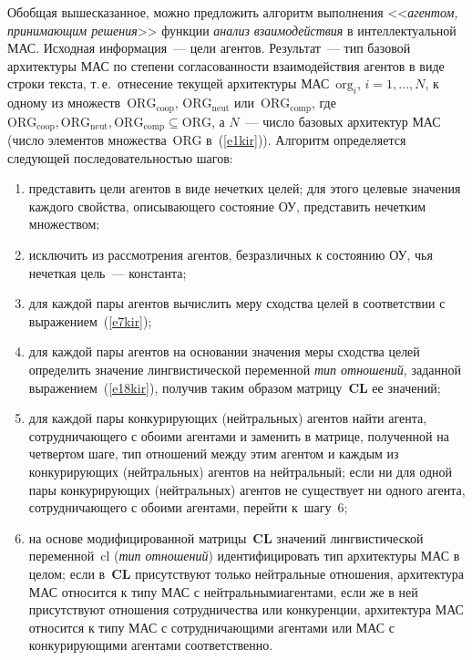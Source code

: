 \begin{multicols}{2}
  Обобщая вышесказанное, можно предложить алгоритм выполнения 
<<\textit{агентом, принимающим решения}>> функции \textit{анализ 
взаимодействия} в интеллектуальной МАС. Исходная информация~--- цели 
агентов. Результат~--- тип базовой архитектуры МАС по степени 
согласованности взаимодействия агентов в виде строки текста, т.\,е.\ отнесение 
текущей архитектуры МАС~$\mathrm{org}_i$, $i = 1, \ldots , N$, к одному из 
множеств~$\mathrm{ORG}_{\mathrm{coop}}$, $\mathrm{ORG}_{\mathrm{neut}}$ или~$\mathrm{ORG}_{\mathrm{comp}}$, где 
$\mathrm{ORG}_{\mathrm{coop}}, \mathrm{ORG}_{\mathrm{neut}}, \mathrm{ORG}_{\mathrm{comp}} 
\subseteq \mathrm{ORG}$, а  $N$~--- число 
базовых архитектур МАС (число элементов множества~ORG в~(\ref{e1kir})). 
Алгоритм определяется следующей последовательностью шагов:
  \begin{enumerate}[(1)]
\item представить цели агентов в виде нечетких целей; для этого целевые 
значения каждого свойства, описывающего состояние ОУ, представить 
нечетким множеством;
\item исключить из рассмотрения агентов, безразличных к состоянию ОУ, чья 
нечеткая цель~--- константа;
\item для каждой пары агентов вычислить меру сходства целей в соответствии с 
выражением~(\ref{e7kir});
\item для каждой пары агентов на основании значения меры сходства целей 
определить значение лингвистической переменной \textit{тип отношений}, 
заданной выражением~(\ref{e18kir}), получив таким образом 
матрицу~\textbf{CL} ее значений;
\item для каждой пары конкурирующих (нейтральных) агентов найти агента, 
сотрудничающего с обоими агентами и заменить в матрице, полученной на 
четвертом шаге, тип отношений между этим агентом и каждым из 
конкурирующих (нейт\-раль\-ных) агентов на нейтральный; если ни для одной 
пары конкурирующих (нейт\-раль\-ных) агентов не существует ни одного агента, 
сотрудничающего с обоими агентами, перейти к~шагу~6;
\item на основе модифицированной матрицы~\textbf{CL} значений 
лингвистической переменной~cl (\textit{тип отношений}) идентифицировать 
тип архитектуры МАС в целом; если в~\textbf{CL} присутствуют только 
нейтральные отношения, архитектура МАС относится к типу МАС с 
нейтральными\linebreak агентами, если же в ней присутствуют отношения 
сотрудничества или конкуренции, архитектура МАС относится к типу МАС с\linebreak 
со\-труд\-ни\-ча\-ющи\-ми агентами или МАС с конкурирующими агентами 
соответственно.
  \end{enumerate}
  

\end{multicols}
